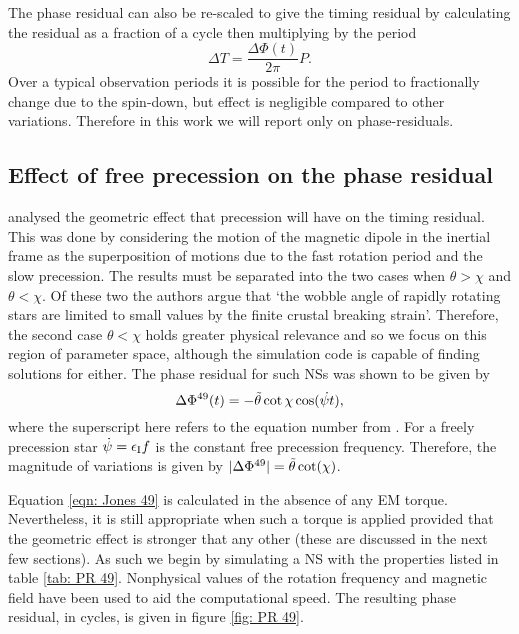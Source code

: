\documentclass[../full_thesis/full_thesis.tex]{subfiles}
\begin{document}
The phase residual can also be re-scaled to give the timing residual by
calculating the residual as a fraction of a cycle then multiplying by the
period
\begin{equation}
    \Delta T = \frac{\Delta\Phi(t)}{2\pi} P.
    \label{eqn: phase to timing}
\end{equation}
Over a typical observation periods it is possible for the period to
fractionally change due to the spin-down, but effect is negligible compared to
other variations. Therefore in this work we will report only on
phase-residuals.

\subsection{Effect of free precession on the phase residual}

\citet{Jones2001} analysed the geometric effect that precession will have on
the timing residual. This was done by considering the motion of the magnetic
dipole in the inertial frame as the superposition of motions due to the fast
rotation period and the slow precession. The results must be separated into the
two cases when $\theta > \chi$ and $\theta < \chi$. Of these two the authors
argue that `the wobble angle  of rapidly rotating stars are limited to small
values by the finite crustal breaking strain'. Therefore, the second case
$\theta < \chi$ holds greater physical relevance and so we focus on this region
of parameter space, although the simulation code is capable of finding solutions
for either. The phase residual for such NSs was shown to be given by
\begin{equation}
    \Delta\Phi^{49}(t) = -\tilde{\theta} \cot\chi\cos(\dot{\psi t}),
    \label{eqn: Jones 49}
\end{equation}
where the superscript here refers to the equation number from \citet{Jones2001}.
For a freely precession star $\dot{\psi}=\epsilon_{\mathrm{I}} f$ is the constant free
precession frequency. Therefore, the magnitude of variations is given by
$|\Delta\Phi^{49}|=\tilde{\theta} \cot(\chi)$.

Equation \eqref{eqn: Jones 49} is calculated in the absence of any EM torque.
Nevertheless, it is still appropriate when such a torque is applied provided
that the geometric effect is stronger that any other (these are discussed in
the next few sections). As such we begin by simulating a NS with the properties
listed in table \ref{tab: PR 49}. Nonphysical values of the
rotation frequency and magnetic field have been used to aid the computational
speed. The resulting phase residual, in cycles, is given in figure \ref{fig:
PR 49}.
\end{document}
